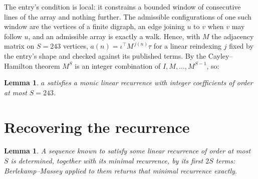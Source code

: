 \documentclass[11pt,a4paper]{article}
\theoremstyle{plain}
\newtheorem{lemma}[theorem]{Lemma}
\theoremstyle{definition}
\begin{document}
The entry's condition is local: it constrains a bounded window of consecutive lines of the
array and nothing further. The admissible configurations of one such window are the vertices
of a finite digraph, an edge joining $u$ to $v$ when $v$ may follow $u$, and an admissible
array is exactly a walk. Hence, with $M$ the adjacency matrix on $S=243$ vertices,
$a(n)=\iota^{\!\top}M^{\,j(n)}\tau$ for a linear reindexing $j$ fixed by the entry's shape
and checked against its published terms. By the Cayley--Hamilton theorem $M^{S}$ is an
integer combination of $I,M,\dots,M^{S-1}$, so:

\begin{lemma}\label{lem:cf}
$a$ satisfies a monic linear recurrence with integer coefficients of order at most $S=243$.
\end{lemma}

\section{Recovering the recurrence}

\begin{lemma}\label{lem:bm}
A sequence known to satisfy some linear recurrence of order at most $S$ is determined, together
with its minimal recurrence, by its first $2S$ terms: Berlekamp--Massey applied to them returns
that minimal recurrence exactly.
\end{lemma}
\end{document}
